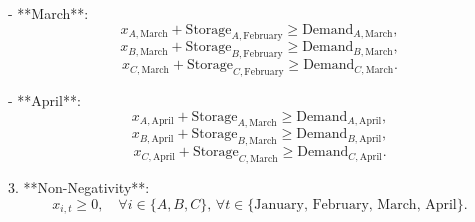 \documentclass[12pt]{article}
\begin{document}
- **March**:
\[
x_{A,\text{March}} + \text{Storage}_{A,\text{February}} \geq \text{Demand}_{A,\text{March}},
\]
\[
x_{B,\text{March}} + \text{Storage}_{B,\text{February}} \geq \text{Demand}_{B,\text{March}},
\]
\[
x_{C,\text{March}} + \text{Storage}_{C,\text{February}} \geq \text{Demand}_{C,\text{March}}.
\]

- **April**:
\[
x_{A,\text{April}} + \text{Storage}_{A,\text{March}} \geq \text{Demand}_{A,\text{April}},
\]
\[
x_{B,\text{April}} + \text{Storage}_{B,\text{March}} \geq \text{Demand}_{B,\text{April}},
\]
\[
x_{C,\text{April}} + \text{Storage}_{C,\text{March}} \geq \text{Demand}_{C,\text{April}}.
\]

3. **Non-Negativity**:
\[
x_{i,t} \geq 0, \quad \forall i \in \{A, B, C\}, \, \forall t \in \{\text{January, February, March, April}\}.
\]
\end{document}
